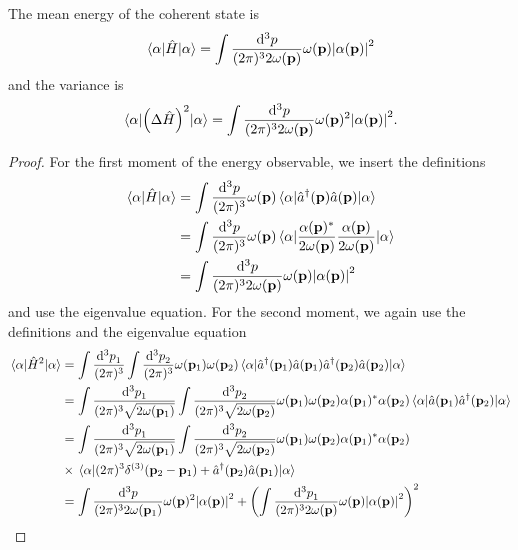 \begin{lemma}\label{thm:qkg_coherent_state_energy}
	The mean energy of the coherent state is
	\begin{equation}
		\expval{\hat{H}}{\alpha}
		=
		\int\frac{\dd[3]{p}}{(2\pi)^32\omega(\vb{p})}
		\omega(\vb{p})
		\abs{\alpha(\vb{p})}^2
	\end{equation}
	and the variance is
	\begin{equation}
		\expval{\left(\Delta\hat{H}\right)^2}{\alpha}
		=
		\int\frac{\dd[3]{p}}{(2\pi)^32\omega(\vb{p})}
		\omega(\vb{p})^2
		\abs{\alpha(\vb{p})}^2
		.
	\end{equation}
\end{lemma}
\begin{proof}
	For the first moment of the energy observable, we insert the definitions
	\begin{equation*}
		\begin{split}
			\expval{\hat{H}}{\alpha}
			&=
			\int\frac{\dd[3]{p}}{(2\pi)^3}
			\omega(\vb{p})
			\expval{\hat{a}^\dagger(\vb{p})\hat{a}(\vb{p})}{\alpha}
			\\
			&=
			\int\frac{\dd[3]{p}}{(2\pi)^3}
			\omega(\vb{p})
			\expval{\frac{\alpha(\vb{p})^*}{2\omega(\vb{p})}\frac{\alpha(\vb{p})}{2\omega(\vb{p})}}{\alpha}
			\\
			&=
			\int\frac{\dd[3]{p}}{(2\pi)^32\omega(\vb{p})}
			\omega(\vb{p})
			\abs{\alpha(\vb{p})}^2
		\end{split}
	\end{equation*}
	and use the eigenvalue equation. For the second moment, we again use the definitions and the eigenvalue equation
	\begin{equation*}
		\begin{split}
			\expval{\hat{H}^2}{\alpha}
			&=
			\int\frac{\dd[3]{p}_1}{(2\pi)^3}
			\int\frac{\dd[3]{p}_2}{(2\pi)^3}
			\omega(\vb{p}_1)
			\omega(\vb{p}_2)
			\expval{
				\hat{a}^\dagger(\vb{p}_1)
				\hat{a}(\vb{p}_1)
				\hat{a}^\dagger(\vb{p}_2)
				\hat{a}(\vb{p}_2)
			}{\alpha}
			\\
			&=
			\int\frac{\dd[3]{p}_1}{(2\pi)^3\sqrt{2\omega(\vb{p}_1)}}
			\int\frac{\dd[3]{p}_2}{(2\pi)^3\sqrt{2\omega(\vb{p}_2)}}
			\omega(\vb{p}_1)
			\omega(\vb{p}_2)
			\alpha(\vb{p}_1)^*
			\alpha(\vb{p}_2)
			\expval{
				\hat{a}(\vb{p}_1)
				\hat{a}^\dagger(\vb{p}_2)
			}{\alpha}
			\\
			&=
			\int\frac{\dd[3]{p}_1}{(2\pi)^3\sqrt{2\omega(\vb{p}_1)}}
			\int\frac{\dd[3]{p}_2}{(2\pi)^3\sqrt{2\omega(\vb{p}_2)}}
			\omega(\vb{p}_1)
			\omega(\vb{p}_2)			
			\alpha(\vb{p}_1)^*
			\alpha(\vb{p}_2)
			\\
			&\times
			\expval{
				(2\pi)^3
				\delta^{(3)}(\vb{p}_2-\vb{p}_1)
				+
				\hat{a}^\dagger(\vb{p}_2)
				\hat{a}(\vb{p}_1)
			}{\alpha}
			\\
			&=
			\int\frac{\dd[3]{p}}{(2\pi)^32\omega(\vb{p}_1)}
			\omega(\vb{p})^2
			\abs{\alpha(\vb{p})}^2
			+
			\left(
				\int\frac{\dd[3]{p}_1}{(2\pi)^32\omega(\vb{p})}
				\omega(\vb{p})
				\abs{\alpha(\vb{p})}^2
			\right)^2
		\end{split}
	\end{equation*}
\end{proof}

